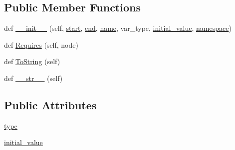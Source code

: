 \subsection*{Public Member Functions}
\begin{DoxyCompactItemize}
\item 
def \mbox{\hyperlink{classgoogletest-master_1_1googlemock_1_1scripts_1_1generator_1_1cpp_1_1ast_1_1_variable_declaration_a2a785737dd79ad71072f23a870b66b35}{\+\_\+\+\_\+init\+\_\+\+\_\+}} (self, \mbox{\hyperlink{classgoogletest-master_1_1googlemock_1_1scripts_1_1generator_1_1cpp_1_1ast_1_1_node_a6f9eb279a989f9ca27e7d0f1975336d1}{start}}, \mbox{\hyperlink{classgoogletest-master_1_1googlemock_1_1scripts_1_1generator_1_1cpp_1_1ast_1_1_node_a747e90ade89c1764e83b5b649bde18cc}{end}}, \mbox{\hyperlink{classgoogletest-master_1_1googlemock_1_1scripts_1_1generator_1_1cpp_1_1ast_1_1___generic_declaration_a85dc1c6f0115301c310cd3f99416fa86}{name}}, var\+\_\+type, \mbox{\hyperlink{classgoogletest-master_1_1googlemock_1_1scripts_1_1generator_1_1cpp_1_1ast_1_1_variable_declaration_a4992f163b68572187e4057d40095ea37}{initial\+\_\+value}}, \mbox{\hyperlink{classgoogletest-master_1_1googlemock_1_1scripts_1_1generator_1_1cpp_1_1ast_1_1___generic_declaration_a285067decd742f4effc0d1bc674bce85}{namespace}})
\item 
def \mbox{\hyperlink{classgoogletest-master_1_1googlemock_1_1scripts_1_1generator_1_1cpp_1_1ast_1_1_variable_declaration_a95245068c49c43521294e83c28bbc89c}{Requires}} (self, node)
\item 
def \mbox{\hyperlink{classgoogletest-master_1_1googlemock_1_1scripts_1_1generator_1_1cpp_1_1ast_1_1_variable_declaration_ac04eccdd556250cce17b9bde10272212}{To\+String}} (self)
\item 
def \mbox{\hyperlink{classgoogletest-master_1_1googlemock_1_1scripts_1_1generator_1_1cpp_1_1ast_1_1_variable_declaration_aed49b55fe3408b73d3c31a5e7f934d83}{\+\_\+\+\_\+str\+\_\+\+\_\+}} (self)
\end{DoxyCompactItemize}
\subsection*{Public Attributes}
\begin{DoxyCompactItemize}
\item 
\mbox{\hyperlink{classgoogletest-master_1_1googlemock_1_1scripts_1_1generator_1_1cpp_1_1ast_1_1_variable_declaration_ab560be8147e37d96b5e8504f8f264a8e}{type}}
\item 
\mbox{\hyperlink{classgoogletest-master_1_1googlemock_1_1scripts_1_1generator_1_1cpp_1_1ast_1_1_variable_declaration_a4992f163b68572187e4057d40095ea37}{initial\+\_\+value}}
\end{DoxyCompactItemize}


